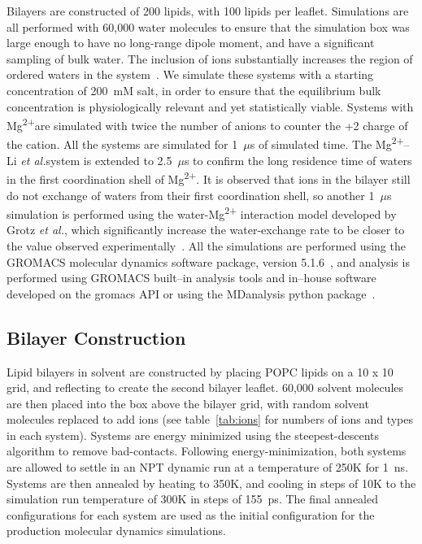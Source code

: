 \documentclass[12pt,openany,final]{book}
\newcommand{\etal}{\textit{et al.}}
\newcommand{\mg}{Mg\textsuperscript{2+}}
\newcommand{\mgmbnbfix}{Mg\textsuperscript{2+}--Li \etal} %
\begin{document}
{Bilayers are constructed of 200 lipids, with 100 lipids per leaflet.}
Simulations are all performed with 
60,000 water molecules to ensure that the simulation box
was large enough to have no long-range dipole moment, 
and have a significant 
sampling of bulk water. The inclusion of ions substantially increases the region of ordered 
waters in the system~\cite{kruczek:2019,saunders:2022}.
We simulate these systems with a starting concentration of 200~mM salt, in order to ensure
that the equilibrium bulk concentration is physiologically relevant and 
{yet} statistically viable.
Systems with \mg are simulated with twice the number of 
anions to counter the +2 charge of the cation. All the systems are simulated for 1~$\mu$s of simulated time. 
The \mgmbnbfix system is extended to 2.5~$\mu$s to confirm the 
long residence time of waters in the first coordination shell of \mg\cite{grotz:2021:optimized}. 
It is observed that ions in the bilayer still do not
exchange of waters from their first coordination shell, 
so another 1~$\mu$s simulation is performed using the water-\mg 
interaction model developed by Grotz \etal, which significantly increase the water-exchange rate to be closer 
to the value observed experimentally~\cite{grotz:2021:optimized}.
{All the} simulations are performed using the GROMACS molecular dynamics software package, 
version 5.1.6~\cite{abraham:2015,pall:2014,van:2005,lindahl:2001,berendsen:1995}, and analysis is performed using 
GROMACS built--in analysis tools and in--house software developed
on the gromacs API or using the MDanalysis python package~\cite{gromacsmanual,mdanalysis1,mdanalysis2}.
\subsection{Bilayer Construction}
Lipid bilayers in solvent are constructed by placing POPC lipids on a 10 x 10 grid,
and reflecting to create the second bilayer leaflet. 60,000 solvent molecules are then placed 
into the box above the bilayer grid, with random solvent molecules replaced to 
add ions (see table~\ref{tab:ions} for numbers of ions and types in each system).
Systems are energy minimized using the steepest-descents algorithm to remove bad-contacts.
Following energy-minimization, both systems are allowed to settle in an NPT dynamic
run at a temperature of 250K for 1~ns. Systems are then annealed by heating to 350K, and
cooling in steps of 10K to the simulation run temperature of 300K in steps of 
155~ps. The final annealed configurations for each system are used as the initial
configuration for the production molecular dynamics simulations.
\end{document}

